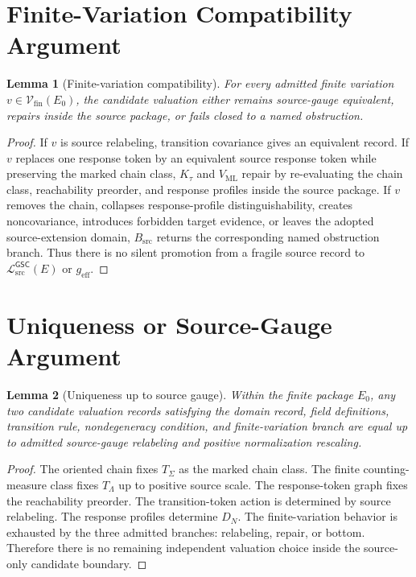 \documentclass[11pt]{article}
\newcommand{\MetricData}{\mathcal{L}_{\mathrm{src}}^{\mathsf{GSC}}}
\newcommand{\geff}{g_{\mathrm{eff}}}
\newcommand{\Ezero}{E_{0}}
\newtheorem{lemma}{Lemma}
\begin{document}
\section{Finite-Variation Compatibility Argument}\label{finite-variation-compatibility-argument}

\begin{lemma}[Finite-variation compatibility]
For every admitted finite variation \(v\in\mathcal{V}_{\mathrm{fin}}(\Ezero)\),
the candidate valuation either remains source-gauge equivalent, repairs inside
the source package, or fails closed to a named obstruction.
\end{lemma}

\begin{proof}
If \(v\) is source relabeling, transition covariance gives an equivalent
record. If \(v\) replaces one response token by an equivalent source response
token while preserving the marked chain class, \(K_{\tau}\) and
\(V_{\mathrm{ML}}\) repair by re-evaluating the chain class, reachability
preorder, and response profiles inside the source package. If \(v\) removes
the chain, collapses response-profile distinguishability, creates
noncovariance, introduces forbidden target evidence, or leaves the adopted
source-extension domain, \(B_{\mathrm{src}}\) returns the corresponding named
obstruction branch. Thus there is no silent promotion from a fragile source
record to \(\MetricData(E)\) or \(\geff\).
\end{proof}

\section{Uniqueness or Source-Gauge Argument}\label{uniqueness-or-source-gauge-argument}

\begin{lemma}[Uniqueness up to source gauge]
Within the finite package \(\Ezero\), any two candidate valuation records
satisfying the domain record, field definitions, transition rule,
nondegeneracy condition, and finite-variation branch are equal up to admitted
source-gauge relabeling and positive normalization rescaling.
\end{lemma}

\begin{proof}
The oriented chain fixes \(T_{\Sigma}\) as the marked chain class. The
finite counting-measure class fixes \(T_{\Lambda}\) up to positive source
scale. The response-token graph fixes the reachability preorder. The
transition-token action is determined by source relabeling. The response
profiles determine \(D_N\). The finite-variation behavior is exhausted by the
three admitted branches: relabeling, repair, or bottom. Therefore there is no
remaining independent valuation choice inside the source-only candidate
boundary.
\end{proof}
\end{document}
